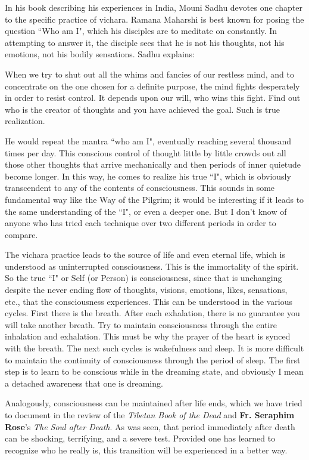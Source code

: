 In his book describing his experiences in India, Mouni Sadhu devotes one chapter to the specific practice of vichara. Ramana Maharshi is best known for posing the question ``Who am I", which his disciples are to meditate on constantly. In attempting to answer it, the disciple sees that he is not his thoughts, not his emotions, not his bodily sensations. Sadhu explains:

\begin{quotex}
When we try to shut out all the whims and fancies of our restless mind, and to concentrate on the one chosen for a definite purpose, the mind fights desperately in order to resist control. It depends upon our will, who wins this fight. Find out who is the creator of thoughts and you have achieved the goal. Such is true realization. 

\end{quotex}
He would repeat the mantra ``who am I", eventually reaching several thousand times per day. This conscious control of thought little by little crowds out all those other thoughts that arrive mechanically and then periods of inner quietude become longer. In this way, he comes to realize his true ``I", which is obviously transcendent to any of the contents of consciousness. This sounds in some fundamental way like the Way of the Pilgrim; it would be interesting if it leads to the same understanding of the ``I", or even a deeper one. But I don't know of anyone who has tried each technique over two different periods in order to compare.

The vichara practice leads to the source of life and even eternal life, which is understood as uninterrupted consciousness. This is the immortality of the spirit. So the true ``I" or Self (or Person) is consciousness, since that is unchanging despite the never ending flow of thoughts, visions, emotions, likes, sensations, etc., that the consciousness experiences. This can be understood in the various cycles. First there is the breath. After each exhalation, there is no guarantee you will take another breath. Try to maintain consciousness through the entire inhalation and exhalation. This must be why the prayer of the heart is synced with the breath. The next such cycles is wakefulness and sleep. It is more difficult to maintain the continuity of consciousness through the period of sleep. The first step is to learn to be conscious while in the dreaming state, and obviously I mean a detached awareness that one is dreaming.

Analogously, consciousness can be maintained after life ends, which we have tried to document in the review of the \textit{Tibetan Book of the Dead} and \textbf{Fr. Seraphim Rose}'s \textit{The Soul after Death}. As was seen, that period immediately after death can be shocking, terrifying, and a severe test. Provided one has learned to recognize who he really is, this transition will be experienced in a better way.

